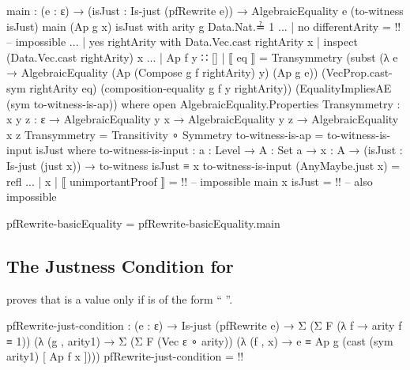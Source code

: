 \documentclass{report}
\begin{document}
\begin{code}
      main : (e : ε) →
             (isJust : Is-just (pfRewrite e)) →
             AlgebraicEquality e (to-witness isJust)
      main (Ap g x) isJust with arity g Data.Nat.≟ 1
      ... | no differentArity = {!!} -- impossible
      ... | yes rightArity with Data.Vec.cast rightArity x
                              | inspect (Data.Vec.cast rightArity) x
      ... | Ap f y ∷ [] | ⟦ eq ⟧ =
            Transymmetry (subst (λ e → AlgebraicEquality (Ap (Compose g f rightArity) y)
                                                         (Ap g e))
                                (VecProp.cast-sym rightArity eq)
                                (composition-equality g f y rightArity))
                         (EqualityImpliesAE (sym to-witness-is-ap))
            where
            open AlgebraicEquality.Properties
            Transymmetry : {x y z : ε} →
                           AlgebraicEquality y x →
                           AlgebraicEquality y z →
                           AlgebraicEquality x z
            Transymmetry = Transitivity ∘ Symmetry
            to-witness-is-ap = to-witness-is-input isJust
              where
              to-witness-is-input :
                {a : Level} →
                {A : Set a} →
                {x : A} →
                (isJust : Is-just (just x)) →
                to-witness isJust ≡ x
              to-witness-is-input (AnyMaybe.just x) = refl
      ... | x | ⟦ unimportantProof ⟧ = {!!} -- impossible
      main x isJust = {!!} -- also impossible

    pfRewrite-basicEquality = pfRewrite-basicEquality.main
\end{code}

\subsection{The Justness Condition for }
 proves that   is a  value only if  is of the form ``  \AgdaInductiveConstructor{[}    \AgdaInductiveConstructor{]}''.

\begin{code}
    pfRewrite-just-condition :
      (e : ε) →
      Is-just (pfRewrite e) →
      Σ (Σ F (λ f → arity f ≡ 1))
        (λ (g , arity1) →
           Σ (Σ F (Vec ε ∘ arity))
             (λ (f , x) →
                e ≡ Ap g (cast (sym arity1) [ Ap f x ])))
    pfRewrite-just-condition = {!!}
\end{code}
\end{document}
